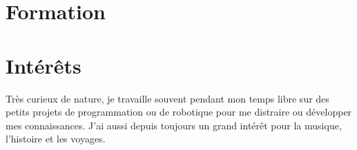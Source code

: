 \documentclass[letterpaper]{twentysecondcv} %
\begin{document}

\section{Formation}

\begin{twenty} %
	
\end{twenty}



%
%
%	
%	
%	
%	
%	
%	



\section{Intérêts}
Très curieux de nature, je travaille souvent pendant mon temps libre sur des petits projets de programmation ou de robotique pour me distraire ou développer mes connaissances. J’ai aussi depuis toujours un grand intérêt pour la musique, l’histoire et les voyages.
\end{document}
